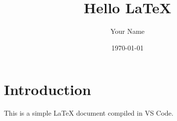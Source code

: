 \documentclass{article}
\title{Hello LaTeX}
\author{Your Name}
\date{\today}
\begin{document}
\maketitle

\section{Introduction}

This is a simple LaTeX document compiled in VS Code.
\end{document}
